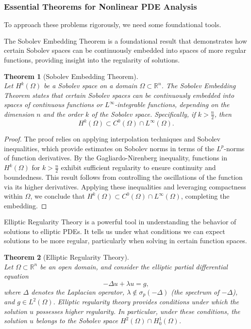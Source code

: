 \documentclass[12pt, reqno]{amsart}
\newtheorem{theorem}{Theorem}[section]
\theoremstyle{definition}
\numberwithin{equation}{section}
\begin{document}
\subsubsection{Essential Theorems for Nonlinear PDE Analysis}
To approach these problems rigorously, we need some foundational tools.

The Sobolev Embedding Theorem is a foundational result that demonstrates how certain Sobolev spaces can be continuously embedded into spaces of more regular functions, providing insight into the regularity of solutions.
\begin{theorem}[Sobolev Embedding Theorem] \hfill \\
Let \( H^k(\Omega) \) be a Sobolev space on a domain \( \Omega \subset \mathbb{R}^n \). The Sobolev Embedding Theorem states that certain Sobolev spaces can be continuously embedded into spaces of continuous functions or \( L^{\infty} \)-integrable functions, depending on the dimension \( n \) and the order \( k \) of the Sobolev space. Specifically, if \( k > \frac{n}{2} \), then
\[
H^k(\Omega) \subset C^0(\Omega) \cap L^{\infty}(\Omega).
\]
\end{theorem}
\vfill
\pagebreak
\begin{proof}
The proof relies on applying interpolation techniques and Sobolev inequalities, which provide estimates on Sobolev norms in terms of the \( L^p \)-norms of function derivatives. By the Gagliardo-Nirenberg inequality, functions in \( H^k(\Omega) \) for \( k > \frac{n}{2} \) exhibit sufficient regularity to ensure continuity and boundedness. This result follows from controlling the oscillations of the function via its higher derivatives. Applying these inequalities and leveraging compactness within \( \Omega \), we conclude that \( H^k(\Omega) \subset C^0(\Omega) \cap L^{\infty}(\Omega) \), completing the embedding.
\end{proof}

Elliptic Regularity Theory is a powerful tool in understanding the behavior of solutions to elliptic PDEs. It tells us under what conditions we can expect solutions to be more regular, particularly when solving in certain function spaces.
\begin{theorem}[Elliptic Regularity Theory] \hfill \\
Let \( \Omega \subset \mathbb{R}^n \) be an open domain, and consider the elliptic partial differential equation
\[
-\Delta u + \lambda u = g,
\]
where \( \Delta \) denotes the Laplacian operator, \( \lambda \notin \sigma_p(-\Delta) \) (the spectrum of \( -\Delta \)), and \( g \in L^2(\Omega) \). Elliptic regularity theory provides conditions under which the solution \( u \) possesses higher regularity. In particular, under these conditions, the solution \( u \) belongs to the Sobolev space \( H^2(\Omega) \cap H_0^1(\Omega) \).
\end{theorem}
\end{document}
